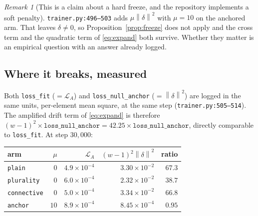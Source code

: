 \documentclass[11pt]{article}
\newcommand{\norm}[1]{\left\lVert #1 \right\rVert}
\theoremstyle{plain}
\theoremstyle{remark}
\newtheorem{remark}[proposition]{Remark}
\begin{document}
\begin{remark}[This is a claim about a hard freeze, and the repository implements a soft penalty]
\texttt{trainer.py:496--503} adds $\mu\norm{\delta}^2$ with $\mu = 10$ on the anchored arm. That
leaves $\delta \neq 0$, so Proposition~\ref{prop:freeze} does not apply and the cross term and the
quadratic term of \eqref{eq:expand} both survive. Whether they matter is an empirical question with
an answer already logged.
\end{remark}

\subsection{Where it breaks, measured}

Both \texttt{loss\_fit} ($=\mathcal{L}_A$) and \texttt{loss\_null\_anchor} ($=\norm{\delta}^2$) are
logged in the same units, per-element mean square, at the same step (\texttt{trainer.py:505--514}).
The amplified drift term of \eqref{eq:expand} is therefore $(w-1)^2 \times
\texttt{loss\_null\_anchor} = 42.25 \times \texttt{loss\_null\_anchor}$, directly comparable to
\texttt{loss\_fit}. At step $30{,}000$:

\begin{center}
\begin{tabular}{lrrrr}
\toprule
arm & $\mu$ & $\mathcal{L}_A$ & $(w-1)^2\norm{\delta}^2$ & ratio \\
\midrule
\texttt{plain}      & $0$    & $4.9\times10^{-4}$ & $3.30\times10^{-2}$ & $67.3$ \\
\texttt{plurality}  & $0$    & $6.0\times10^{-4}$ & $2.32\times10^{-2}$ & $38.7$ \\
\texttt{connective} & $0$    & $5.0\times10^{-4}$ & $3.34\times10^{-2}$ & $66.8$ \\
\texttt{anchor}     & $10$   & $8.9\times10^{-4}$ & $8.45\times10^{-4}$ & $\mathbf{0.95}$ \\
\bottomrule
\end{tabular}
\end{center}
\end{document}
